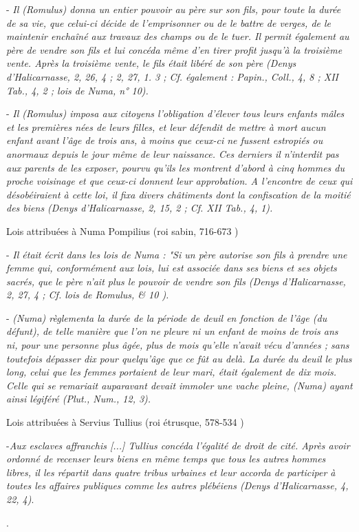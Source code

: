 {- \emph{Il (Romulus) donna un entier pouvoir au père sur son fils, pour toute la durée de sa vie, que celui-ci décide de l'emprisonner ou de le battre de verges, de le maintenir enchaîné aux travaux des champs ou de le tuer. Il permit également au père de vendre son fils et lui concéda même d'en tirer profit jusqu'à la troisième vente. Après la troisième vente, le fils était libéré de son père (Denys d'Halicarnasse, 2, 26, 4 ; 2, 27, 1. 3 ; Cf. également : Papin., Coll., 4, 8 ; XII Tab., 4, 2 ; lois de Numa, n° 10).}

- \emph{Il (Romulus) imposa aux citoyens l'obligation d'élever tous leurs enfants mâles et les premières nées de leurs filles, et leur défendit de mettre à mort aucun enfant avant l'âge de trois ans, à moins que ceux-ci ne fussent estropiés ou anormaux depuis le jour même de leur naissance. Ces derniers il n'interdit pas aux parents de les exposer, pourvu qu'ils les montrent d'abord à cinq hommes du proche voisinage et que ceux-ci donnent leur approbation. A l'encontre de ceux qui désobéiraient à cette loi, il fixa divers châtiments dont la confiscation de la moitié des biens (Denys d'Halicarnasse, 2, 15, 2 ; Cf. XII Tab., 4, 1).}

Lois attribuées à Numa Pompilius   (roi sabin, 716-673 )

- \emph{Il était écrit dans les lois de Numa : "\emph{Si un père autorise son fils à prendre une femme qui, conformément aux lois, lui est associée dans ses biens et ses objets sacrés, que le père n'ait plus le pouvoir de vendre son fils} (Denys d'Halicarnasse, 2, 27, 4 ; Cf. lois de Romulus,  \& 10 ).}

- \emph{(Numa) règlementa la durée de la période de deuil en fonction de l'âge (du défunt), de telle manière que l'on ne pleure ni un enfant de moins de trois ans ni, pour une personne plus âgée, plus de mois qu'elle n'avait vécu d'années ; sans toutefois dépasser dix pour quelqu'âge que ce fût au delà. La durée du deuil le plus long, celui que les femmes portaient de leur mari, était également de dix mois. Celle qui se remariait auparavant devait immoler une vache pleine, (Numa) ayant ainsi légiféré (Plut., Num., 12, 3).}

Lois attribuées à Servius Tullius (roi étrusque, 578-534 )

-\emph{Aux esclaves affranchis [...] Tullius concéda l'égalité de droit de cité. Après avoir ordonné de recenser leurs biens en même temps que tous les autres hommes libres, il les répartit dans quatre tribus urbaines et leur accorda de participer à toutes les affaires publiques comme les autres plébéiens (Denys d'Halicarnasse, 4, 22, 4)}.}.
